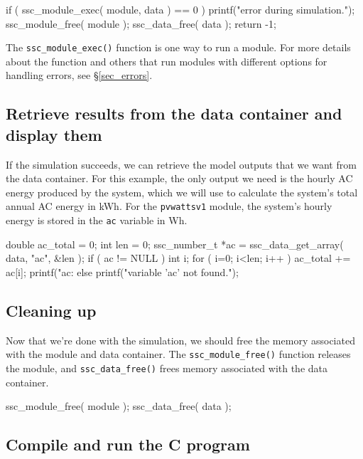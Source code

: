 \documentclass{scrartcl} %
\begin{document}
\begin{verbatimtab}[4]
	if ( ssc_module_exec( module, data ) == 0 )
	{
		printf("error during simulation.\n");
		ssc_module_free( module );
		ssc_data_free( data );
		return -1;
	}
\end{verbatimtab}

The \texttt{ssc\_module\_exec()} function is one way to run a module. For more details about the function and others that run modules with different options for handling errors, see \S\ref{sec_errors}.

\subsection{Retrieve results from the data container and display them}

If the simulation succeeds, we can retrieve the model outputs that we want from the data container. For this example, the only output we need is the hourly AC energy produced by the system, which we will use to calculate the system's total annual AC energy in kWh. For the \texttt{pvwattsv1} module, the system's hourly energy is stored in the \texttt{ac} variable in Wh.

\begin{verbatimtab}[4]
	double ac_total = 0;
	int len = 0;
	ssc_number_t *ac = ssc_data_get_array( data, "ac", &len );
	if ( ac != NULL )
	{
		int i;
		for ( i=0; i<len; i++ )
			ac_total += ac[i];
		printf("ac: %
	}
	else
	{
		printf("variable 'ac' not found.\n");
	}
\end{verbatimtab}

\subsection{Cleaning up}

Now that we're done with the simulation, we should free the memory associated with the module and data container. The \texttt{ssc\_module\_free()} function releases the module, and \texttt{ssc\_data\_free()} frees memory associated with the data container. 

\begin{verbatimtab}	
	ssc_module_free( module );
	ssc_data_free( data );
\end{verbatimtab}

\subsection{Compile and run the C program}
\end{document}

